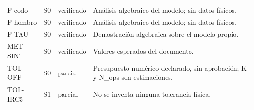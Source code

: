 \begin{longtable}{lllp{9cm}}
F-codo & S0 & verificado & An\'alisis algebraico del modelo; sin datos f\'isicos. \\
F-hombro & S0 & verificado & An\'alisis algebraico del modelo; sin datos f\'isicos. \\
F-TAU & S0 & verificado & Demostraci\'on algebraica sobre el modelo propio. \\
MET-SINT & S0 & verificado & Valores esperados del documento. \\
TOL-OFF & S0 & parcial & Presupuesto num\'erico declarado, sin aprobaci\'on; K y N\_ops son estimaciones. \\
TOL-IRC5 & S1 & parcial & No se inventa ninguna tolerancia f\'isica. \\
\end{longtable}
\endgroup
